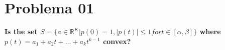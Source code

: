 \section*{Problema 01}

\textbf{Is the set $S =\{a \in \mathbb{R}^K | p(0)=1, |p(t)|\leq 1 for t \in [\alpha,\beta]\}$ where $p(t)=a_1 +a_2t +\dots+a_kt^{k-1}$ convex?}